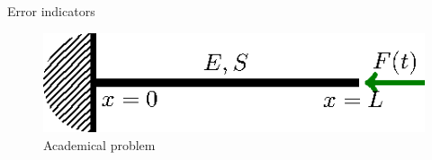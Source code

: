\documentclass[12pt]{beamer}
\begin{document}
\begin{frame}{Error indicators}


\begin{figure}
	\begin{minipage}{0.45\linewidth}
			\includegraphics[width=1\linewidth]{Beam-tikz-0.eps}
			\caption{\centering Academical problem}		
	\end{minipage}
	\end{figure}
		

\end{frame}
\end{document}
